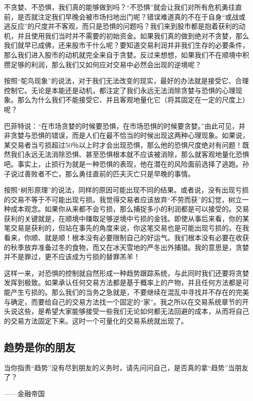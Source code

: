 不贪婪、不恐惧，我们真的能够做到吗？“不恐惧”就会让我们对所有危机勇往直前，是否就注定我们早晚会被市场扫地出门呢？错误难道真的不在于自身“或战或逃反应”的尺度并不客观，而只是恐惧的问题吗？我们来到股市都是抱着获利的动机，并且使用我们当时并不需要的初始资金。如果我们真的做到绝对不贪婪，那么我们就早已成佛，还来股市干什么呢？要知道交易利润并非我们生存的必要条件，那么我们进入股市的动机就完全来自于贪婪。反过来想想，如果我们不在顺境中积攒足够的利润，那么我们又如何应对交易中必然会出现的逆境呢？

按照“鸵鸟现象”的说法，对于我们无法改变的现实，最好的办法就是接受它、合理控制它。无论是本能还是动机，都注定了我们永远无法消除贪婪与恐惧的心理现象。那么为什么我们不能接受它、并且客观地量化它（将其固定在一定的尺度上）呢？

巴菲特说：“在市场贪婪的时候要恐惧，在市场恐惧的时候要贪婪。”由此可见，并非贪婪与恐惧的错误，而是人们在最不恰当的时候出现这两种心理现象。如果说，某交易者当亏损超过50％以上时才会出现恐惧，那么他的恐惧尺度绝对有问题！既然我们永远无法消除恐惧、甚至恐惧根本就不应该被消除，那么就客观地量化恐惧吧。事实上，止损行为就是一种恐惧的表现，他在潜在的风险面前选择了逃跑。孙子说过善败者不亡，那么勇往直前的匹夫灭亡只是早晚的事情。

按照“树形原理”的说法，同样的原因可能出现不同的结果。或者说，没有出现亏损的交易不等于不可能出现亏损。我觉得交易者应该放弃“不劳而获”的幻觉，树立一种成本观念。如果你从来都不会亏损，那么捕捉多小的利润都是可以接受的。交易获利的关键就是，在顺境中赚取足够逆境中亏损的金钱。即使从事后来看，你的某笔交易是获利的，但站在事先的角度来说，你这笔交易也是可能出现亏损的。在我看来，你顺、就是顺！根本没有必要限制自己的好运气。我们根本没有必要在收获的秋季放弃准备过冬的食物，而又在冰天雪地的严冬出外捕猎。我的意思是，贪婪并不是罪过，更不应该成为亏损的替罪羔羊！

这样一来，对恐惧的控制就自然形成一种趋势跟踪系统，与此同时我们还要将贪婪发挥到极致。如果承认任何交易方法都是基于概率上的产物，并且任何方法都是可能产生亏损的。那么我们的当务之急就是，不要继续在混乱中寻找并不存在的完美与确定，而要给自己的交易方法找一个固定的“家”。我之所以在交易系统章节的开头说这些，是希望大家能够接受一些我们无论如何都无法回避的成本，从而将自己的交易方法固定下来。这时一个可量化的交易系统就出现了。

\subsection{趋势是你的朋友}

{\kaishu
当你指责“趋势”没有尽到朋友的义务时，请先问问自己，是否真的拿“趋势”当朋友了？

\hfill ——金融帝国
}

